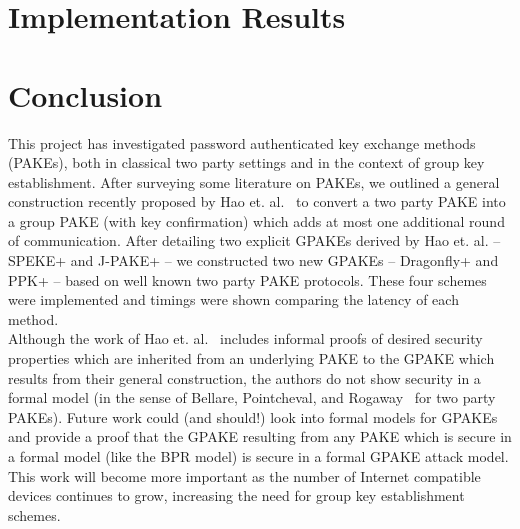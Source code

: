 \documentclass{amsart}
\theoremstyle{remark}
\begin{document}

\section{Implementation Results}
\label{sec:Implementation}

\vspace{0.3in}


\section{Conclusion}
\label{sec:Conclusion}
This project has investigated password authenticated key exchange methods (PAKEs), both in classical two party settings
and in the context of group key establishment.  After surveying some literature on PAKEs, we outlined a general construction
recently proposed by Hao et. al.~\cite{HaYiChSh15} to convert a two party PAKE into a group PAKE (with key confirmation) 
which adds at most one additional round of communication.  After detailing two explicit GPAKEs derived by Hao et. al. -- 
SPEKE+ and J-PAKE+ -- we constructed two new GPAKEs -- Dragonfly+ and PPK+ -- based on well known two party PAKE protocols.
These four schemes were implemented and timings were shown comparing the latency of each method.
\\

Although the work of Hao et. al.~\cite{HaYiChSh15} includes informal proofs of desired security properties which are inherited
from an underlying PAKE to the GPAKE which results from their general construction, the authors do not show security in a formal
model (in the sense of Bellare, Pointcheval, and Rogaway~\cite{BePoRo00} for two party PAKEs).  Future work could (and should!) look 
into formal models for GPAKEs and provide a proof that the GPAKE resulting
from any PAKE which is secure in a formal model (like the BPR model) is secure in a formal GPAKE attack model.  This work will become more important as
the number of Internet compatible devices continues to grow, increasing the need for group key establishment schemes.




\nocite{*}


\end{document}
